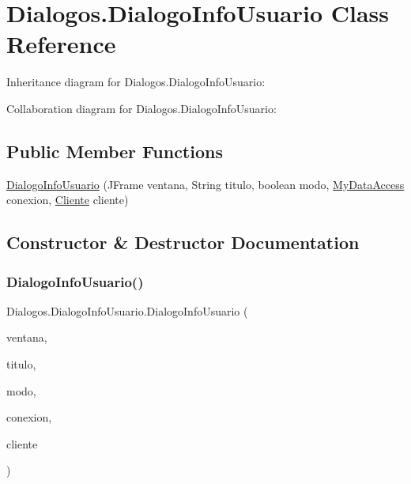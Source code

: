 \hypertarget{class_dialogos_1_1_dialogo_info_usuario}{}\section{Dialogos.\+Dialogo\+Info\+Usuario Class Reference}
\label{class_dialogos_1_1_dialogo_info_usuario}


Inheritance diagram for Dialogos.\+Dialogo\+Info\+Usuario\+:


Collaboration diagram for Dialogos.\+Dialogo\+Info\+Usuario\+:
\subsection*{Public Member Functions}
\begin{DoxyCompactItemize}
\item 
\mbox{\hyperlink{class_dialogos_1_1_dialogo_info_usuario_a982fb6f8438bc01fe5496a16b890ab29}{Dialogo\+Info\+Usuario}} (J\+Frame ventana, String titulo, boolean modo, \mbox{\hyperlink{classconexion_s_q_l_1_1_my_data_access}{My\+Data\+Access}} conexion, \mbox{\hyperlink{classclientes_1_1_cliente}{Cliente}} cliente)
\end{DoxyCompactItemize}


\subsection{Constructor \& Destructor Documentation}
\mbox{\label{class_dialogos_1_1_dialogo_info_usuario_a982fb6f8438bc01fe5496a16b890ab29}} 
\subsubsection{\texorpdfstring{Dialogo\+Info\+Usuario()}{DialogoInfoUsuario()}}
{\footnotesize\ttfamily Dialogos.\+Dialogo\+Info\+Usuario.\+Dialogo\+Info\+Usuario (\begin{DoxyParamCaption}\item[{J\+Frame}]{ventana,  }\item[{String}]{titulo,  }\item[{boolean}]{modo,  }\item[{\mbox{\hyperlink{classconexion_s_q_l_1_1_my_data_access}{My\+Data\+Access}}}]{conexion,  }\item[{\mbox{\hyperlink{classclientes_1_1_cliente}{Cliente}}}]{cliente }\end{DoxyParamCaption})\hspace{0.3cm}{\ttfamily [inline]}}

